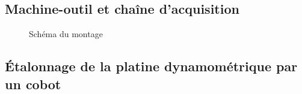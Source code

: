 \documentclass{style/presentation}
\begin{document}
\subsection{Machine-outil et chaîne d'acquisition}

\begin{frame}

        \begin{figure}
            \centering
            \resizebox{!}{.75\textheight}{}
            \caption{Schéma du montage}
        \end{figure}
\end{frame}

\subsection{Étalonnage de la platine dynamométrique par un cobot}
\end{document}
